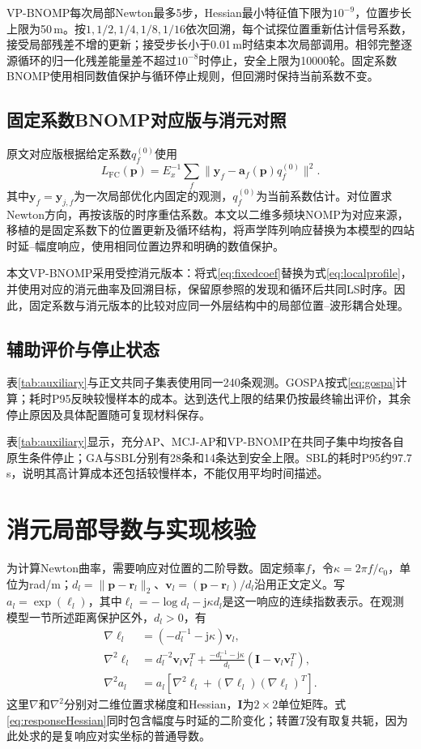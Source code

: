 VP-BNOMP每次局部Newton最多5步，Hessian最小特征值下限为$10^{-9}$，位置步长上限为50\,m。按$1,1/2,1/4,1/8,1/16$依次回溯，每个试探位置重新估计信号系数，接受局部残差不增的更新；接受步长小于0.01\,m时结束本次局部调用。相邻完整逐源循环的归一化残差能量差不超过$10^{-8}$时停止，安全上限为10000轮。固定系数BNOMP使用相同数值保护与循环停止规则，但回溯时保持当前系数不变。

\subsection{固定系数BNOMP对应版与消元对照}
原文对应版根据给定系数$q_f^{(0)}$使用
\begin{equation}
 L_{\mathrm{FC}}(\bm p)=E_x^{-1}\sum_f
 \|\bm y_f-\bm a_f(\bm p)q_f^{(0)}\|^2 .\label{eq:fixedcoef}
\end{equation}
其中$\bm y_f=\bm y_{j,f}$为一次局部优化内固定的观测，$q_f^{(0)}$为当前系数估计。对位置求Newton方向，再按该版的时序重估系数。本文以二维多频块NOMP\cite{Yang2022}为对应来源，移植的是固定系数下的位置更新及循环结构，将声学阵列响应替换为本模型的四站时延--幅度响应，使用相同位置边界和明确的数值保护。

本文VP-BNOMP采用受控消元版本：将式\eqref{eq:fixedcoef}替换为式\eqref{eq:localprofile}，并使用对应的消元曲率及回溯目标，保留原参照的发现和循环后共同LS时序。因此，固定系数与消元版本的比较对应同一外层结构中的局部位置--波形耦合处理。

\subsection{辅助评价与停止状态}
表\ref{tab:auxiliary}与正文共同子集表使用同一240条观测。GOSPA按式\eqref{eq:gospa}计算；耗时P95反映较慢样本的成本。达到迭代上限的结果仍按最终输出评价，其余停止原因及具体配置随可复现材料保存。

表\ref{tab:auxiliary}显示，充分AP、MCJ-AP和VP-BNOMP在共同子集中均按各自原生条件停止；GA与SBL分别有28条和14条达到安全上限。SBL的耗时P95约97.7\,s，说明其高计算成本还包括较慢样本，不能仅用平均时间描述。

\clearpage
\section{消元局部导数与实现核验}\label{app:derivatives}
为计算Newton曲率，需要响应对位置的二阶导数。固定频率$f$，令$\kappa=2\pi f/c_0$，单位为rad/m；$d_l=\|\bm p-\bm r_l\|_2$、$\bm v_l=(\bm p-\bm r_l)/d_l$沿用正文定义。写$a_l=\exp(\ell_l)$，其中$\ell_l=-\log d_l-\mathrm j\kappa d_l$是这一响应的连续指数表示。在观测模型一节所述距离保护区外，$d_l>0$，有
\begin{align}
 \nabla\ell_l&=(-d_l^{-1}-\mathrm j\kappa)\bm v_l,\\
 \nabla^2\ell_l&=d_l^{-2}\bm v_l\bm v_l^T
 +\frac{-d_l^{-1}-\mathrm j\kappa}{d_l}
 (\bm I-\bm v_l\bm v_l^T),\\
 \nabla^2 a_l&=a_l[\nabla^2\ell_l+(\nabla\ell_l)(\nabla\ell_l)^T].\label{eq:responseHessian}
\end{align}
这里$\nabla$和$\nabla^2$分别对二维位置求梯度和Hessian，$\bm I$为$2\times2$单位矩阵。式\eqref{eq:responseHessian}同时包含幅度与时延的二阶变化；转置$T$没有取复共轭，因为此处求的是复响应对实坐标的普通导数。

